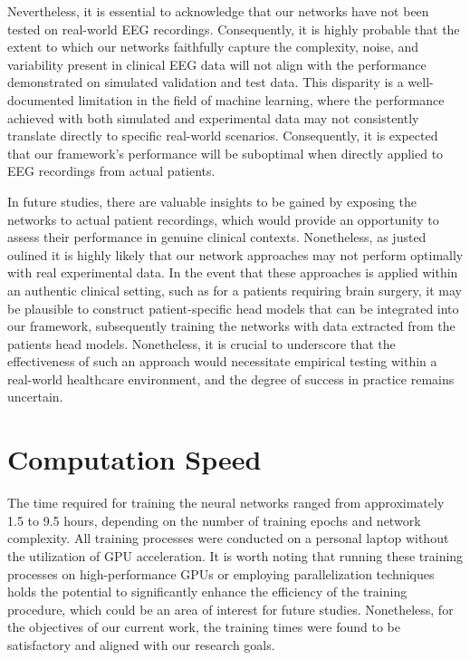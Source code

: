 \documentclass[a4paper, UKenglish, 11pt]{uiomaster}
\begin{document}
Nevertheless, it is essential to acknowledge that our networks have not been tested on real-world EEG recordings. Consequently, it is highly probable that the extent to which our networks faithfully capture the complexity, noise, and variability present in clinical EEG data will not align with the performance demonstrated on simulated validation and test data. This disparity is a well-documented limitation in the field of machine learning, where the performance achieved with both simulated and experimental data may not consistently translate directly to specific real-world scenarios. Consequently, it is expected that our framework's performance will be suboptimal when directly applied to EEG recordings from actual patients.

In future studies, there are valuable insights to be gained by exposing the networks to actual patient recordings, which would provide an opportunity to assess their performance in genuine clinical contexts. Nonetheless, as justed oulined it is highly likely that our network approaches may not perform optimally with real experimental data. In the event that these approaches is applied within an authentic clinical setting, such as for a patients requiring brain surgery, it may be plausible to construct patient-specific head models that can be integrated into our framework, subsequently training the networks with data extracted from the patients head models. Nonetheless, it is crucial to underscore that the effectiveness of such an approach would necessitate empirical testing within a real-world healthcare environment, and the degree of success in practice remains uncertain.

\section{Computation Speed} \label{sec:time}
The time required for training the neural networks ranged from approximately 1.5 to 9.5 hours, depending on the number of training epochs and network complexity. All training processes were conducted on a personal laptop without the utilization of GPU acceleration. It is worth noting that running these training processes on high-performance GPUs or employing parallelization techniques holds the potential to significantly enhance the efficiency of the training procedure, which could be an area of interest for future studies. Nonetheless, for the objectives of our current work, the training times were found to be satisfactory and aligned with our research goals.
\end{document}

